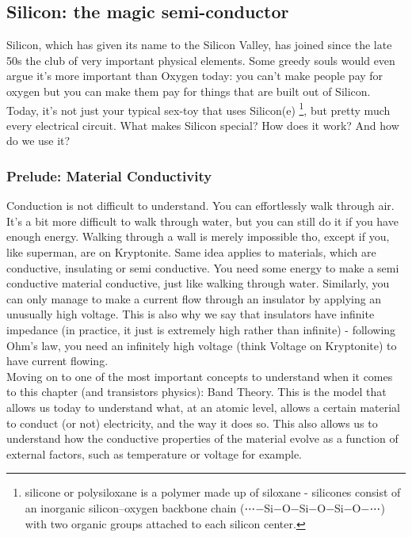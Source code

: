 \subsection{Silicon: the magic semi-conductor}

Silicon, which has given its name to the Silicon Valley, has joined since the late 50s the club of very important physical elements. Some greedy souls would even argue it's more important than Oxygen today: you can't make people pay for oxygen but you can make them pay for things that are built out of Silicon. Today, it's not just your typical sex-toy that uses Silicon(e) \footnote{silicone or polysiloxane is a polymer made up of siloxane - silicones consist of an inorganic silicon–oxygen backbone chain (⋯−Si−O−Si−O−Si−O−⋯) with two organic groups attached to each silicon center.}, but pretty much every electrical circuit. What makes Silicon special? How does it work? And how do we use it? 

\subsubsection{Prelude: Material Conductivity}

Conduction is not difficult to understand. You can effortlessly walk through air. It's a bit more difficult to walk through water, but you can still do it if you have enough energy. Walking through a wall is merely impossible tho, except if you, like superman, are on Kryptonite. Same idea applies to materials, which are conductive, insulating or semi conductive. You need some energy to make a semi conductive material conductive, just like walking through water. Similarly, you can only manage to make a current flow through an insulator by applying an unusually high voltage. This is also why we say that insulators have infinite impedance (in practice, it just is extremely high rather than infinite) - following Ohm's law, you need an infinitely high voltage (think Voltage on Kryptonite) to have current flowing. \\

Moving on to one of the most important concepts to understand when it comes to this chapter (and transistors physics): Band Theory. This is the model that allows us today to understand what, at an atomic level, allows a certain material to conduct (or not) electricity, and the way it does so. This also allows us to understand how the conductive properties of the material evolve as a function of external factors, such as temperature or voltage for example. 

